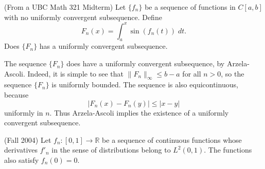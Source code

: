 \documentclass{exam}
\theoremstyle{problemstyle}
\newcommand{\1}[1]{\textbf{1}_{\left[#1\right]}} %
\def\R{\mathbb{R}} %
\begin{document}
\begin{questions}
\question (From a UBC Math 321 Midterm) Let $\{ f_n \}$ be a sequence of functions in $C[a,b]$ with no uniformly convergent subsequence. Define
%
\[ F_n(x) = \int_a^x \sin(f_n(t))\; dt. \]
%
Does $\{ F_n \}$ has a uniformly convergent subsequence.
\begin{solution}
    The sequence $\{ F_n \}$ does have a uniformly convergent subsequence, by Arzela-Ascoli. Indeed, it is simple to see that $\| F_n \|_\infty \leq b - a$ for all $n > 0$, so the sequence $\{ F_n \}$ is uniformly bounded. The sequence is also equicontinuous, because
    \[ |F_n(x) - F_n(y)| \leq |x - y| \]
    uniformly in $n$. Thus Arzela-Ascoli implies the existence of a uniformly convergent subsequence.
\end{solution}

\question (Fall 2004) Let $f_{n}:[0,1]\to \R$ be a sequence of continuous functions whose derivatives $f'_{n}$ in the sense of distributions belong to $L^{2}(0,1)$. The functions also satisfy $f_{n}(0)=0$.
\begin{parts}

\end{parts}
\end{questions}
\end{document}
